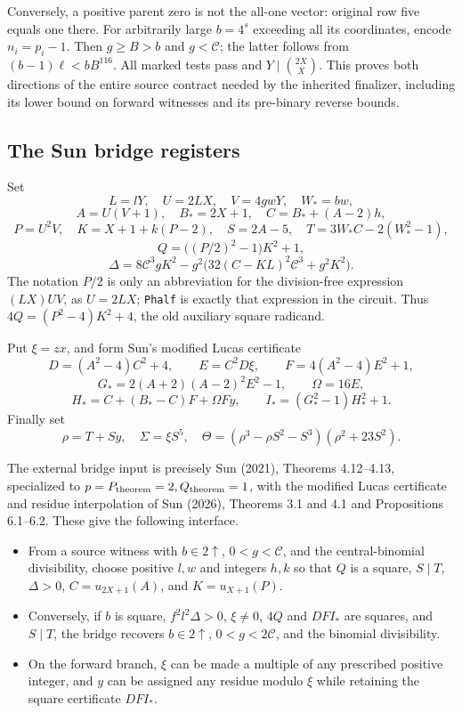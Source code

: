 Conversely, a positive parent zero is not the all-one vector: original
row five equals one there. For arbitrarily large $b=4^s$ exceeding all
its coordinates, encode $n_i=p_i-1$. Then $g\ge B>b$ and $g<\mathcal C$;
the latter follows from $(b-1)\ell<bB^{116}$. All marked tests pass and
$Y\mid\binom{2X}{X}$. This proves both directions of the entire source
contract needed by the inherited finalizer, including its lower bound on
forward witnesses and its pre-binary reverse bounds.

\subsection{The Sun bridge registers}\label{the-sun-bridge-registers}

Set \[
 L=lY,\quad U=2LX,\quad V=4gwY,\quad W_*=bw,
\] \[
 A=U(V+1),\quad B_*=2X+1,\quad C=B_*+(A-2)h,
\] \[
 P=U^2V,\quad K=X+1+k(P-2),\quad
 S=2A-5,\quad T=3W_*C-2(W_*^2-1),
\] \[
 Q=\bigl((P/2)^2-1\bigr)K^2+1,
\] \[
 \Delta=8\mathcal C^3gK^2-
 g^2\bigl(32(C-KL)^2\mathcal C^3+g^2K^2\bigr).
\] The notation \(P/2\) is only an abbreviation for the division-free
expression \((LX)UV\), as \(U=2LX\); \texttt{Phalf} is exactly that
expression in the circuit. Thus \(4Q=(P^2-4)K^2+4\), the old auxiliary
square radicand.

Put \(\xi=zx\), and form Sun's modified Lucas certificate \[
 D=(A^2-4)C^2+4,\qquad E=C^2D\xi,\qquad
 F=4(A^2-4)E^2+1,
\] \[
 G_*=2(A+2)(A-2)^2E^2-1,\qquad \Omega=16E,
\] \[
 H_*=C+(B_*-C)F+\Omega Fy,\qquad I_*=(G_*^2-1)H_*^2+1.
\] Finally set \[
 \rho=T+Sy,\quad \Sigma=\xi S^5,\quad
 \Theta=(\rho^3-\rho S^2-S^3)(\rho^2+23S^2).
\]

The external bridge input is precisely Sun (2021), Theorems 4.12--4.13,
specialized to \(p=P_{\rm theorem}=2,Q_{\rm theorem}=1\), with the
modified Lucas certificate and residue interpolation of Sun (2026),
Theorems 3.1 and 4.1 and Propositions 6.1--6.2. These give the following
interface.

\begin{itemize}
\item
  From a source witness with \(b\in2\uparrow\), \(0<g<\mathcal C\), and
  the central-binomial divisibility, choose positive \(l,w\) and
  integers \(h,k\) so that \(Q\) is a square, \(S\mid T\), \(\Delta>0\),
  \(C=u_{2X+1}(A)\), and \(K=u_{X+1}(P)\).
\item
  Conversely, if \(b\) is square, \(f^2l^2\Delta>0\), \(\xi\ne0\),
  \(4Q\) and \(DFI_*\) are squares, and \(S\mid T\), the bridge recovers
  \(b\in2\uparrow\), \(0<g<2\mathcal C\), and the binomial divisibility.
\item
  On the forward branch, \(\xi\) can be made a multiple of any
  prescribed positive integer, and \(y\) can be assigned any residue
  modulo \(\xi\) while retaining the square certificate \(DFI_*\).
\end{itemize}

